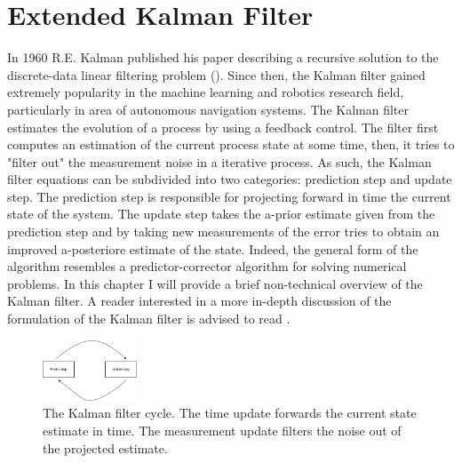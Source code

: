 \documentclass[mscthesis]{usiinfthesis}
\begin{document}
\section{Extended Kalman Filter}

In 1960 R.E. Kalman published his paper describing a recursive solution to the discrete-data linear filtering problem (\citet{paper:kalmanfilter}). Since then, the Kalman filter gained extremely popularity in the machine learning and robotics research field, particularly in area of autonomous navigation systems. The Kalman filter estimates the evolution of a process by using a feedback control. The filter first computes an estimation of the current process state at some time, then, it tries to "filter out" the measurement  noise in a iterative process. As such, the Kalman filter equations can be subdivided into two categories: prediction step and update step. The prediction step is responsible for projecting forward in time the current state of the system. The update step takes the a-prior estimate given from the prediction step and by taking new measurements of the error tries to obtain an improved a-posteriore estimate of the state. Indeed, the general form of the algorithm resembles a predictor-corrector algorithm for solving numerical problems. In this chapter I will provide a brief non-technical overview of the Kalman filter. A reader interested in a more in-depth discussion of the formulation of the Kalman filter is advised to read \citet{paper:Maybeck79}.


\begin{figure}[h]
    \centering
    \includegraphics[width=0.25\textwidth]{kalman_diagram.png}
    \caption{The Kalman filter cycle. The time update forwards the current state estimate in time. The measurement update filters the noise out of the projected estimate.}
    \label{fig:kalman_cycle}
\end{figure}
\end{document}
